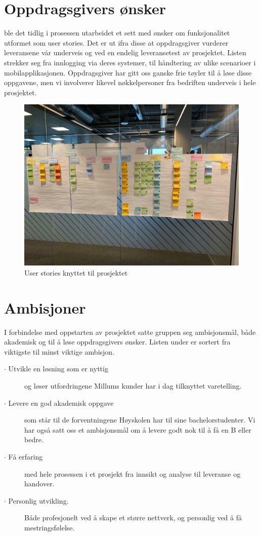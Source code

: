 \section{\textbf{Oppdragsgivers ønsker}}
 ble det tidlig i prosessen utarbeidet et sett med ønsker om funksjonalitet utformet som user stories. Det er ut ifra disse at oppdragsgiver vurderer leveransene vår underveis og ved en endelig leveransetest av prosjektet. Listen strekker seg fra innlogging via deres systemer, til håndtering av ulike scenarioer i mobilapplikasjonen. Oppdragsgiver har gitt oss ganske frie tøyler til å løse disse oppgavene, men vi involverer likevel nøkkelpersoner fra bedriften underveis i hele prosjektet.

\begin{figure}[H] 
    \centering
    \includegraphics[width=\textwidth]{figures/Innledning/post-it.jpg}
    \caption{User stories knyttet til prosjektet}
\end{figure}

\section{\textbf{Ambisjoner}}
I forbindelse med oppstarten av prosjektet satte gruppen seg ambisjonsmål, både akademisk og til å løse oppdragsgivers ønsker. Listen under er sortert fra viktigste til minst viktige ambisjon.

\begin{description}
\item[$\cdot$ Utvikle en løsning som er nyttig]og løser utfordringene Millums kunder har i dag tilknyttet varetelling.
\item[$\cdot$ Levere en god akademisk oppgave]som står til de forventningene Høyskolen har til sine bachelorstudenter. Vi har også satt oss et ambisjonsmål om å levere godt nok til å få en B eller bedre.
\item[$\cdot$ Få erfaring]med hele prosessen i et prosjekt fra innsikt og analyse til leveranse og handover.
\item[$\cdot$ Personlig utvikling.]Både profesjonelt ved å skape et større nettverk, og personlig ved å få mestringsfølelse.
\end{description}